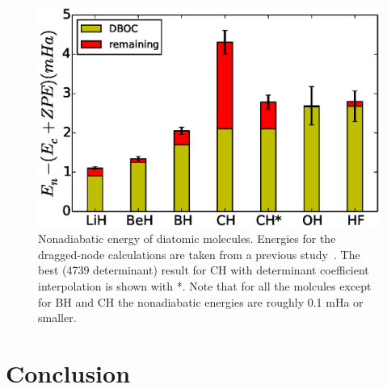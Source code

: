 \documentclass[aip,jcp,numerical,reprint]{revtex4-1}
\begin{document}
\begin{figure}[h]
\includegraphics[scale=0.5]{4738}
\caption{Nonadiabatic energy of diatomic molecules.   Energies for the dragged-node calculations are taken from a previous study~\cite{Yang2015}. The best (4739 determinant) result for CH with determinant coefficient interpolation is shown with *.  Note that for all the molcules except for BH and CH the nonadiabatic energies are roughly 0.1 mHa or smaller.\label{fig:det} }
\end{figure}

\section{Conclusion}
\end{document}
